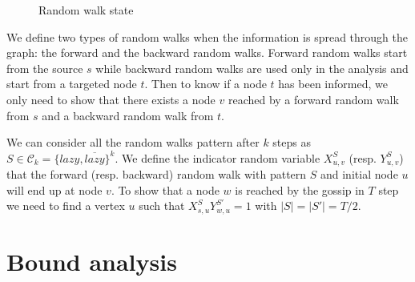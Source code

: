 \documentclass[10pt,journal,a4paper]{IEEEtran}
\begin{document}
\begin{figure}[h]
\centering
{}
\caption{Random walk state}
\label{fig:lazyFSM}
\end{figure}

We define two types of random walks when the information is spread through the graph: the forward and the backward random walks. Forward random walks start from the source $s$ while backward random walks are used only in the analysis and start from a targeted node $t$. Then to know if a node $t$ has been informed, we only need to show that there exists a node $v$ reached by a forward random walk from $s$ and a backward random walk from $t$.

We can consider all the random walks pattern after $k$ steps as $S \in \mathcal C_k = \{ lazy, \overline{lazy} \}^k$. We define the indicator random variable $X_{u,v}^S$ (resp. $Y_{u,v}^S$) that the forward (resp. backward) random walk with pattern $S$ and initial node $u$ will end up at node $v$. To show that a node $w$ is reached by the gossip in $T$ step we need to find a vertex $u$ such that $X_{s,u}^{S}Y_{w,u}^{S'} = 1$ with $|S| = |S'| = T/2$.

\section{Bound analysis}


\end{document}
